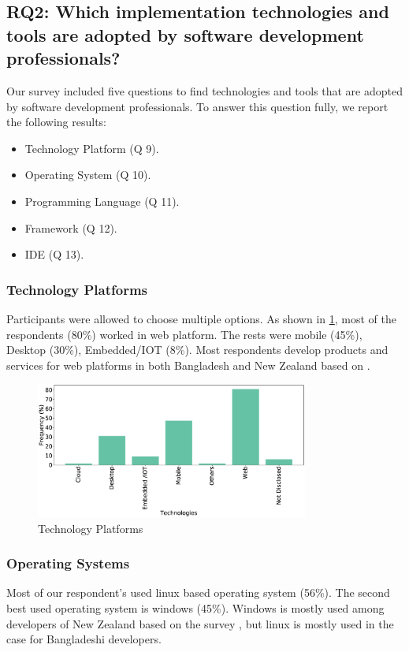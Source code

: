 \subsection{RQ2: Which implementation technologies and tools are adopted by software development professionals?}
\label{RQ2}

Our survey included five questions to find technologies and tools that are adopted by software development professionals. To answer this question fully, we report the following results:
\begin{itemize}
\item Technology Platform (Q 9).
\item Operating System (Q 10).
\item Programming Language (Q 11).
\item Framework (Q 12).
\item IDE (Q 13).
\end{itemize}

\subsubsection{Technology Platforms}
Participants were allowed to choose multiple options. As shown in \ref{fig:platforms}, most of the respondents (80\%) worked in web platform. The rests were mobile (45\%), Desktop (30\%), Embedded/IOT (8\%). Most respondents develop products and services for web platforms in both Bangladesh and New Zealand based on \cite{Wang2018}.

\begin{figure}[htbp]
\centering
  \includegraphics[width=0.8\textwidth]{Figures/Respondents_Technologies}
  \caption{Technology Platforms}
  \label{fig:platforms}
\end{figure}

\subsubsection{Operating Systems}
Most of our respondent's used linux based operating system (56\%). The second best used operating system is windows (45\%). Windows is mostly used among developers of New Zealand based on the survey \cite{Wang2018}, but linux is mostly used in the case for Bangladeshi developers.


